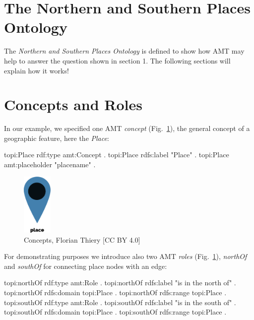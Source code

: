 \documentclass[twocolumn]{autart}
\begin{document}
\section{The Northern and Southern Places Ontology}

The \textit{Northern and Southern Places Ontology}\cite{thiery_zenodo_1} is defined to show how AMT may help to answer the question shown in section 1. The following sections will explain how it works!

\section{Concepts and Roles}

In our example, we specified one AMT \textit{concept} (Fig.~\ref{concepts}), the general concept of a geographic feature, here the \textit{Place}:

\begin{verbnobox}
topi:Place rdf:type amt:Concept .
topi:Place rdfs:label "Place" .
topi:Place amt:placeholder "placename" .
\end{verbnobox}

\begin{figure}[!htb]
\begin{center}
\includegraphics[height=3cm]{concepts.png}
\caption{Concepts, Florian Thiery [CC BY 4.0]}
\label{concepts}
\end{center}
\end{figure}

For demonstrating purposes we introduce also two AMT \textit{roles} (Fig.~\ref{concepts}), \textit{northOf} and \textit{southOf} for connecting place nodes with an edge:

\begin{verbnobox}
topi:northOf rdf:type amt:Role .
topi:northOf rdfs:label "is in the north of" .
topi:northOf rdfs:domain topi:Place .
topi:northOf rdfs:range topi:Place .
topi:southOf rdf:type amt:Role .
topi:southOf rdfs:label "is in the south of" .
topi:southOf rdfs:domain topi:Place .
topi:southOf rdfs:range topi:Place .
\end{verbnobox}
\end{document}

